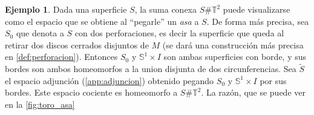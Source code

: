 \documentclass[10pt]{report}
\newcommand{\Toro}{\mathbb{T}^2}
\theoremstyle{definition}
\newtheorem{eje}[defin]{Ejemplo}
\begin{document}
\begin{eje}%
Dada una superficie $S$, la suma conexa $S\# \Toro$ puede visualizarse como el espacio que se obtiene al ``pegarle'' un \textit{asa} a $S$. De forma más precisa, sea $S_0$ que denota a $S$ con dos perforaciones, es decir la superficie que queda al retirar dos discos cerrados disjuntos de $M$ (se dará una construcción más precisa en \autoref{def:perforacion}). Entonces $S_0$ y $\mathbb{S}^1\times I$ son ambas superficies con borde, y sus bordes son ambos homeomorfos a la union disjunta de dos circunferencias. Sea $\tilde{S}$ el espacio adjunción (\autoref{app:adjuncion}) obtenido pegando $S_0$ y $\mathbb{S}^1\times I$ por sus bordes. Este espacio cociente es homeomorfo a $S\# \Toro$. La razón, que se puede ver en la \autoref{fig:toro_asa}

\end{eje}
\end{document}

